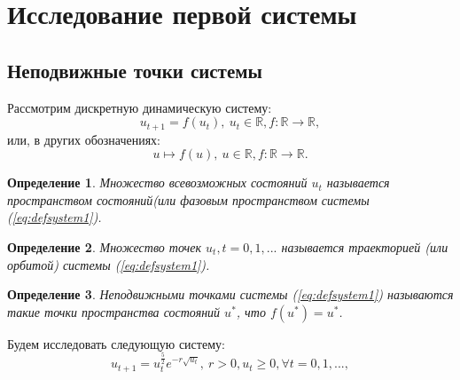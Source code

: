 \documentclass[12pt]{article}
\newtheorem{definition}{Определение}
\begin{document}
\newpage
\section{Исследование первой системы}
\subsection{Неподвижные точки системы}
Рассмотрим дискретную динамическую систему:
\begin{equation}
    u_{t+1} = f(u_t), ~ u_t \in \mathbb{R}, f: \mathbb{R} \rightarrow \mathbb{R}, \label{eq:defsystem1}
\end{equation}
или, в других обозначениях:
\begin{equation}
    u \mapsto f(u), ~ u \in \mathbb{R}, f: \mathbb{R} \rightarrow \mathbb{R}. \label{eq:defsystem2}
\end{equation}
\begin{definition}
    Множество всевозможных состояний $u_t$ называется \textit{пространством состояний}(или \textit{фазовым пространством} системы (\ref{eq:defsystem1}).
\end{definition}
\begin{definition}
    Множество точек $u_t, t = 0, 1, ...$ называется \textit{траекторией} (или \textit{орбитой}) системы (\ref{eq:defsystem1}).
\end{definition}
\begin{definition}
    Неподвижными точками системы (\ref{eq:defsystem1}) называются такие точки пространства состояний $u^*$, что $f(u^*) = u^*$.  
\end{definition}
Будем исследовать следующую систему:
$$
    u_{t+1} = u_t^{\frac{5}{2}}e^{-r\sqrt{u_t}}, ~ r > 0, u_t \geqslant 0, \forall t = 0, 1, ...,
$$
\end{document}
